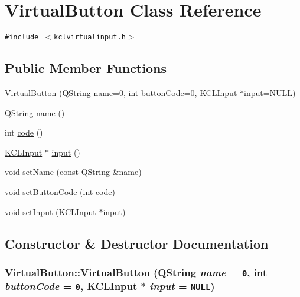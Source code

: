 \hypertarget{class_virtual_button}{
\section{VirtualButton Class Reference}
\label{class_virtual_button}
}
{\tt \#include $<$kclvirtualinput.h$>$}

\subsection*{Public Member Functions}
\begin{CompactItemize}
\item 
\hyperlink{class_virtual_button_446757ea5603b9d9bd90391d31a7de98}{VirtualButton} (QString name=0, int buttonCode=0, \hyperlink{class_k_c_l_input}{KCLInput} $\ast$input=NULL)
\item 
QString \hyperlink{class_virtual_button_6a5bdaf694c545e88225f9aff3a89d78}{name} ()
\item 
int \hyperlink{class_virtual_button_807d21790a5cfa564b1e20d28f900051}{code} ()
\item 
\hyperlink{class_k_c_l_input}{KCLInput} $\ast$ \hyperlink{class_virtual_button_1c67f8dec41ff21d0aa5c07225771e07}{input} ()
\item 
void \hyperlink{class_virtual_button_f66cc874223da73e9e68f05f4470a2a1}{setName} (const QString \&name)
\item 
void \hyperlink{class_virtual_button_fb49f0be2e423669ed4ef30e2d4c11a4}{setButtonCode} (int code)
\item 
void \hyperlink{class_virtual_button_08f64dcc90e220b3ff9720f2cdf29072}{setInput} (\hyperlink{class_k_c_l_input}{KCLInput} $\ast$input)
\end{CompactItemize}


\subsection{Constructor \& Destructor Documentation}
\hypertarget{class_virtual_button_446757ea5603b9d9bd90391d31a7de98}{
\subsubsection[{VirtualButton}]{\setlength{\rightskip}{0pt plus 5cm}VirtualButton::VirtualButton (QString {\em name} = {\tt 0}, \/  int {\em buttonCode} = {\tt 0}, \/  {\bf KCLInput} $\ast$ {\em input} = {\tt NULL})}}
\label{class_virtual_button_446757ea5603b9d9bd90391d31a7de98}





